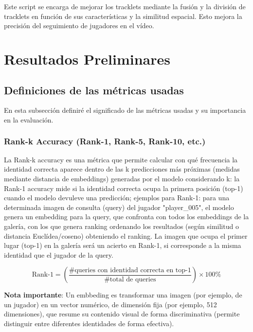 \documentclass[12pt, a4paper, twoside]{article}
\begin{document}
	Este script se encarga de mejorar los tracklets mediante la fusión y la división de tracklets en función de sus características y la similitud espacial. Esto mejora la precisión del seguimiento de jugadores en el vídeo.
	
	
	
	\section{Resultados Preliminares}
	
	\subsection{Definiciones de las métricas usadas}
	
	En esta subsección definiré el significado de las métricas usadas y su importancia en la evaluación.
	
	\subsubsection{Rank-k Accuracy (Rank-1, Rank-5, Rank-10, etc.)}
	
	La Rank-k accuracy es una métrica que permite calcular con qué frecuencia la identidad correcta aparece dentro de las k predicciones más próximas (medidas mediante distancia de embeddings) generadas por el modelo considerando k: la Rank-1 accuracy mide si la identidad correcta ocupa la primera posición (top-1) cuando el modelo devuleve una predicción; ejemplos para Rank-1: para una determinada imagen de consulta (query) del jugador "player\_005", el modelo genera un embedding para la query, que confronta con todos los embeddings de la galería, con los que genera ranking ordenando los resultados (según similitud o distancia Euclídea/coseno) obteniendo el ranking. La imagen que ocupa el primer lugar (top-1) en la galería será un acierto en Rank-1, si corresponde a la misma identidad que el jugador de la query.
	
	\begin{equation}
		\text{Rank-1} = \left( \frac{\text{\# queries con identidad correcta en top-1}}{\text{\# total de queries}} \right) \times 100\%
	\end{equation}
	
	\textbf{Nota importante}: Un embbeding es transformar una imagen (por ejemplo, de un jugador) en un vector numérico, de dimensión fija (por ejemplo, 512 dimensiones), que resume su contenido visual de forma discriminativa (permite distinguir entre diferentes identidades de forma efectiva).
	
\end{document}
